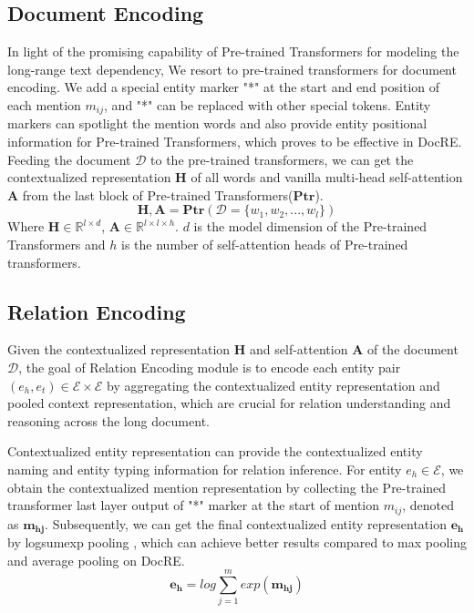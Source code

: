 \documentclass[11pt]{article}
\begin{document}
\subsection{Document Encoding}
    In light of the promising capability of Pre-trained Transformers\citep{devlin-etal-2019-bert,liu_roberta_2019} for modeling the long-range text dependency, We resort to pre-trained transformers for document encoding. We add a special entity marker "*"\citep{zhang-etal-2017-position} at the start and end position of each mention $m_{ij}$, and "*" can be replaced with other special tokens. Entity markers can spotlight the mention words and also provide entity positional information for Pre-trained Transformers, which proves to be effective in DocRE\citep{zhou_atlop_2021}. Feeding the document $\mathcal{D}$ to the pre-trained transformers, we can get the contextualized representation $\mathbf{H}$ of all words and vanilla multi-head self-attention $\mathbf{A}$ from the last block of Pre-trained Transformers($\mathbf{Ptr}$).
    \begin{equation}
        \mathbf{H},\mathbf{A} = \mathbf{Ptr}(\mathcal{D}=\{w_1,w_2,...,w_l\})
    \end{equation}
    Where $\mathbf{H} \in \mathbb{R}^{l \times d}$, $\mathbf{A} \in \mathbb{R}^{l \times l \times h}$. $d$ is the model dimension of the Pre-trained Transformers and $h$ is the number of self-attention heads of Pre-trained transformers.
\subsection{Relation Encoding}
    Given the contextualized representation $\mathbf{H}$ and self-attention $\mathbf{A}$ of the document $\mathcal{D}$, the goal of Relation Encoding module is to encode each entity pair $(e_h,e_t) \in \mathcal{E} \times \mathcal{E}$ by aggregating the contextualized entity representation and pooled context representation, which are crucial for relation understanding and reasoning across the long document.
    
    Contextualized entity representation can provide the contextualized entity naming and entity typing information for relation inference. For entity $e_h \in \mathcal{E}$, we obtain the contextualized mention representation by collecting the Pre-trained transformer last layer output of "*" marker at the start of mention $m_{ij}$, denoted as $\mathbf{m_{hj}}$. Subsequently, we can get the final contextualized entity representation $\mathbf{e_h}$ by logsumexp pooling \citep{jia-etal-2019-document}, which can achieve better results compared to max pooling and average pooling on DocRE\citep{zhou_atlop_2021}.
    \begin{equation}
        \mathbf{e_h} = log \sum _{j=1}^{m} exp(\mathbf{m_{hj}})
    \end{equation}
    
\end{document}
